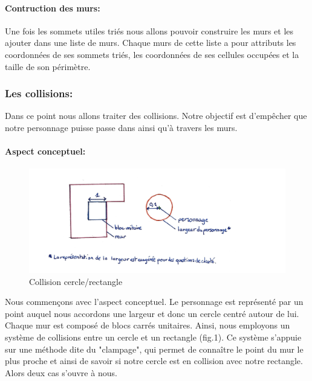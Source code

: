 \documentclass[12pt]{report}
\begin{document}
\paragraph{Contruction des murs:}
Une fois les sommets utiles triés nous allons pouvoir construire les murs et les ajouter dans une liste de murs. Chaque murs de cette liste a pour attributs les coordonnées de ses sommets triés, les coordonnées de ses cellules occupées et la taille de son périmètre.

\subsubsection{Les collisions:}

Dans ce point nous allons traiter des collisions. Notre objectif est d'empêcher
que notre personnage puisse passe dans ainsi qu'à travers les murs.

\paragraph{Aspect conceptuel:}

\begin{figure}
	\centering
	\includegraphics[width=1\textwidth]{image/fig1.jpg}
	\caption{Collision cercle/rectangle}
	\label{fig:collision_cercle_rectangle}
\end{figure}

Nous commençons avec l'aspect conceptuel.
Le personnage est représenté par un point auquel nous accordons une 
largeur et donc un cercle centré autour de lui. Chaque mur est composé de 
blocs carrés unitaires. Ainsi, nous employons un système de collisions 
entre un cercle et un rectangle (fig.1). 
Ce système s'appuie sur une méthode dite du "clampage", qui permet de connaître le point du mur le plus proche 
et ainsi de savoir si notre cercle est en collision avec notre rectangle.
Alors deux cas s'ouvre à nous.
\end{document}
